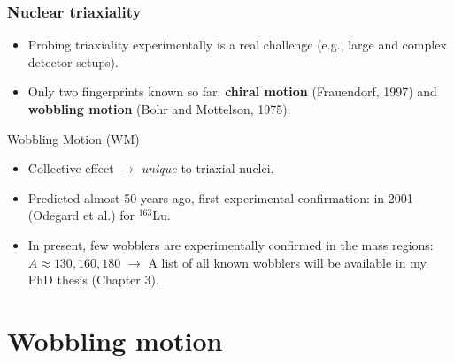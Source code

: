 \documentclass{beamer}
\begin{document}
\begin{frame}
  \frametitle{Nuclear triaxiality}

\begin{itemize}
  \item Probing triaxiality experimentally is a real challenge (e.g., large and complex detector setups).
  \item Only two fingerprints known so far: \textbf{chiral motion} (Frauendorf, 1997) and \textbf{wobbling motion} (Bohr and Mottelson, 1975).
\end{itemize}

\begin{block}{Wobbling Motion (WM)}
  \begin{itemize}
    \item Collective effect $\rightarrow$ \emph{unique} to triaxial nuclei.
    \item Predicted almost 50 years ago, first experimental confirmation: in 2001 (Odegard et al.) for $^{163}$Lu.
    \item In present, few wobblers are experimentally confirmed in the mass regions: $A\approx130,160,180$ $\rightarrow$ {\color{brown}A list of all known wobblers will be available in my PhD thesis (Chapter 3)}. 
  \end{itemize}
\end{block}

\end{frame}

\section{Wobbling motion}
\end{document}
